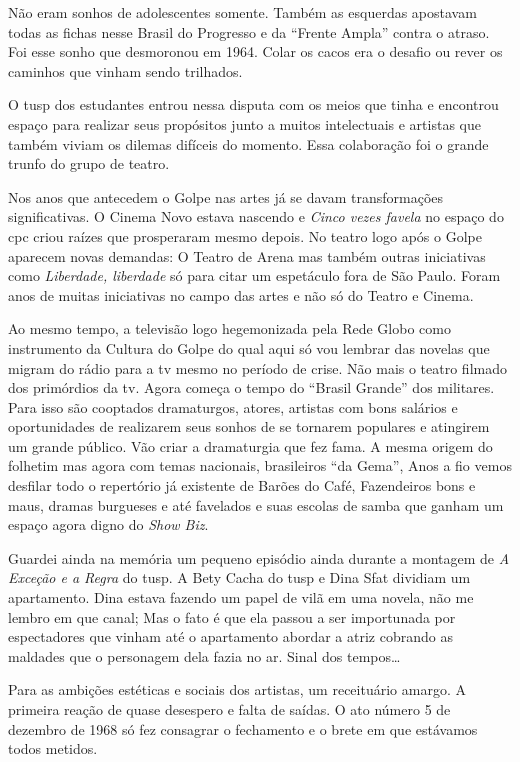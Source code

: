 Não eram sonhos de adolescentes somente. Também as esquerdas apostavam
todas as fichas nesse Brasil do Progresso e da “Frente Ampla” contra o
atraso. Foi esse sonho que desmoronou em 1964. Colar os cacos era o
desafio ou rever os caminhos que vinham sendo trilhados.

O {\sc tusp} dos estudantes entrou nessa disputa com os meios que tinha e
encontrou espaço para realizar seus propósitos junto a muitos
intelectuais e artistas que também viviam os dilemas difíceis do
momento. Essa colaboração foi o grande trunfo do grupo de teatro.

Nos anos que antecedem o Golpe nas artes já se davam transformações
significativas. O Cinema Novo estava nascendo e {\it Cinco vezes favela}
no espaço do {\sc cpc} criou raízes que prosperaram mesmo depois. No teatro
logo após o Golpe aparecem novas demandas: O Teatro de Arena mas também
outras iniciativas como {\it Liberdade, liberdade} só para citar um
espetáculo fora de São Paulo. Foram anos de muitas iniciativas no campo
das artes e não só do Teatro e Cinema.

Ao mesmo tempo, a televisão logo hegemonizada pela Rede Globo como
instrumento da Cultura do Golpe do qual aqui só vou lembrar das novelas
que migram do rádio para a {\sc tv} mesmo no período de crise. Não mais o
teatro filmado dos primórdios da {\sc tv}. Agora começa o tempo do “Brasil
Grande” dos militares. Para isso são cooptados dramaturgos, atores,
artistas com bons salários e oportunidades de realizarem seus sonhos de
se tornarem populares e atingirem um grande público. Vão criar a
dramaturgia que fez fama. A mesma origem do folhetim mas agora com temas
nacionais, brasileiros “da Gema”, Anos a fio vemos desfilar todo o
repertório já existente de Barões do Café, Fazendeiros bons e maus,
dramas burgueses e até favelados e suas escolas de samba que ganham um
espaço agora digno do {\it Show Biz}.

Guardei ainda na memória um pequeno episódio ainda durante a montagem de
{\it A Exceção e a Regra} do {\sc tusp}. A Bety Cacha do {\sc tusp} e Dina Sfat
dividiam um apartamento. Dina estava fazendo um papel de vilã em uma
novela, não me lembro em que canal; Mas o fato é que ela passou a ser
importunada por espectadores que vinham até o apartamento abordar a
atriz cobrando as maldades que o personagem dela fazia no ar. Sinal dos
tempos\ldots{}

Para as ambições estéticas e sociais dos artistas, um receituário
amargo. A primeira reação de quase desespero e falta de saídas. O ato
número 5 de dezembro de 1968 só fez consagrar o fechamento e o brete em
que estávamos todos metidos.

